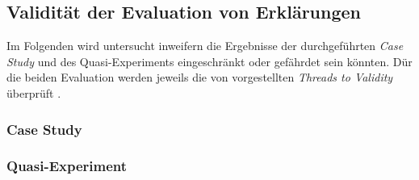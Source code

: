 \subsection{Validität der Evaluation von Erklärungen}

Im Folgenden wird untersucht inweifern die Ergebnisse der durchgeführten \textit{Case Study} und des Quasi-Experiments eingeschränkt oder gefährdet sein könnten. Dür die beiden Evaluation werden jeweils die von \citeauthor{wohlin2012experimentation} vorgestellten \textit{Threads to Validity} überprüft \cite{wohlin2012experimentation}.

\subsubsection{Case Study}

\subsubsection{Quasi-Experiment}


